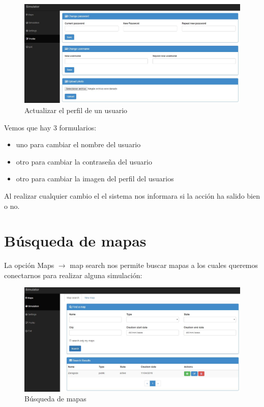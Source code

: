 \begin{figure}[H]
	\centering\includegraphics[scale=0.25]{imagenes/capitulo6/perfil-del-usuario.jpg}
	\caption{Actualizar el perfil de un usuario}
	\label{img:UpdateUser}
\end{figure}

Vemos que hay 3 formularios:

\begin{itemize}
	\item uno para cambiar el nombre del usuario
	\item otro para cambiar la contraseña del usuario
	\item otro para cambiar la imagen del perfil del usuarios
\end{itemize}

Al realizar cualquier cambio el el sistema nos informara si la acción ha salido bien o no.

\section{Búsqueda de mapas}\label{sec:BuscarMapas}

La opción Maps $\rightarrow$ map search nos permite buscar mapas a los cuales queremos conectarnos para realizar alguna simulación:

\begin{figure}[H]
	\centering\includegraphics[scale=0.25]{imagenes/capitulo7/busqueda-de-mapas.jpg}
	\caption{Búsqueda de mapas}
	\label{img:BuscarMapas}
\end{figure}

